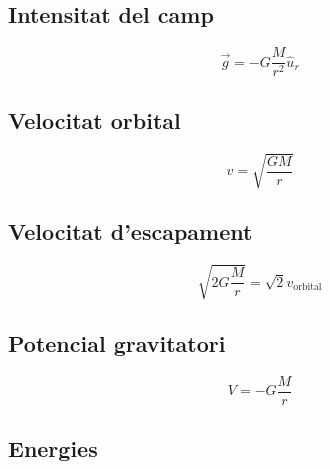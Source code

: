 \vspace{1cm}

\begin{multicols}{2}

    \subsection{Intensitat del camp}
    \label{sub:intensitat_del_camp}

    \begin{equation}
        \vec{g} = -G \frac{M}{r^2} \hat{u}_r
    \end{equation}

    \subsection{Velocitat orbital}
    \label{sub:velocitat_orbital}

    \begin{equation}
        v = \sqrt{\frac{GM}{r}}
    \end{equation}

    \subsection{Velocitat d'escapament}
    \label{sub:velocitat_d_escapament}

    \begin{equation}
        \sqrt{2G\frac{M}{r}} = \sqrt{2}v_\text{orbital}
    \end{equation}

    \subsection{Potencial gravitatori}
    \label{sub:potencial_gravitatori}
    
    \begin{equation}
        V = -G \frac{M}{r}
    \end{equation}

\end{multicols}

\subsection{Energies}
\label{sub:energies}

